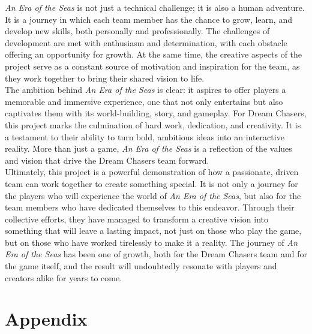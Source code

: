 \documentclass{article}
\begin{document}
\textit{An Era of the Seas} is not just a technical challenge; it is also a human adventure. It is a journey in which each team member has the chance to grow, learn, and develop new skills, both personally and professionally. The challenges of development are met with enthusiasm and determination, with each obstacle offering an opportunity for growth. At the same time, the creative aspects of the project serve as a constant source of motivation and inspiration for the team, as they work together to bring their shared vision to life.\\

The ambition behind \textit{An Era of the Seas} is clear: it aspires to offer players a memorable and immersive experience, one that not only entertains but also captivates them with its world-building, story, and gameplay. For Dream Chasers, this project marks the culmination of hard work, dedication, and creativity. It is a testament to their ability to turn bold, ambitious ideas into an interactive reality. More than just a game, \textit{An Era of the Seas} is a reflection of the values and vision that drive the Dream Chasers team forward.\\

Ultimately, this project is a powerful demonstration of how a passionate, driven team can work together to create something special. It is not only a journey for the players who will experience the world of \textit{An Era of the Seas}, but also for the team members who have dedicated themselves to this endeavor. Through their collective efforts, they have managed to transform a creative vision into something that will leave a lasting impact, not just on those who play the game, but on those who have worked tirelessly to make it a reality. The journey of \textit{An Era of the Seas} has been one of growth, both for the Dream Chasers team and for the game itself, and the result will undoubtedly resonate with players and creators alike for years to come.



















\newpage
\section*{Appendix}
\end{document}
